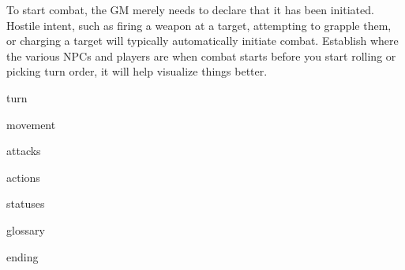 To start combat, the GM merely needs to declare that it has been initiated. Hostile intent, such
as firing a weapon at a target, attempting to grapple them, or charging a target will typically
automatically initiate combat. Establish where the various NPCs and players are when combat
starts before you start rolling or picking turn order, it will help visualize things better.

{turn}

{movement}

{attacks}

{actions}

{statuses}

{glossary}

{ending}
